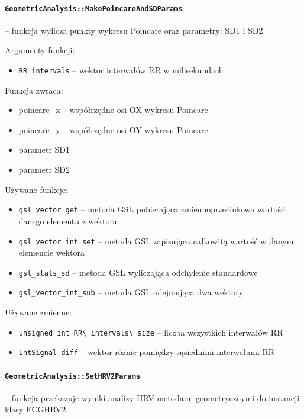 \documentclass[a4paper, 11pt]{article}
\begin{document}
\paragraph{\texttt{GeometricAnalysis::MakePoincareAndSDParams}} -- funkcja wylicza punkty wykresu Poincare oraz parametry: SD1 i SD2.

\medskip{}


Argumenty funkcji:
\begin{itemize}
\item \verb+RR_intervals+ -- wektor interwałów RR w milisekundach
\end{itemize}
\medskip{}


Funkcja zwraca:
\begin{itemize}
\item poincare\_x -- współrzędne osi OX wykresu Poincare
\item poincare\_y -- współrzędne osi OY wykresu Poincare
\item parametr SD1
\item parametr SD2
\end{itemize}
\medskip{}


Używane funkcje:
\begin{itemize}
\item \verb+gsl_vector_get+ -- metoda GSL pobierająca zmiennoprzecinkową wartość
danego elementu z wektora
\item \verb+gsl_vector_int_set+ -- metoda GSL zapisująca całkowitą wartość w
danym elemencie wektora
\item \verb+gsl_stats_sd+ -- metoda GSL wyliczająca odchylenie standardowe
\item \verb+gsl_vector_int_sub+ -- metoda GSL odejmująca dwa wektory
\end{itemize}
\medskip{}


Używane zmienne:
\begin{itemize}
\item \verb+unsigned int RR\_intervals\_size+ -- liczba wszystkich interwałów RR
\item \verb+IntSignal diff+ -- wektor różnic pomiędzy sąsiednimi interwałami RR
\end{itemize}
%

\paragraph{\texttt{GeometricAnalysis::SetHRV2Params}} -- funkcja przekazuje wyniki analizy HRV metodami geometrycznymi do instancji
klasy ECGHRV2.
\end{document}
